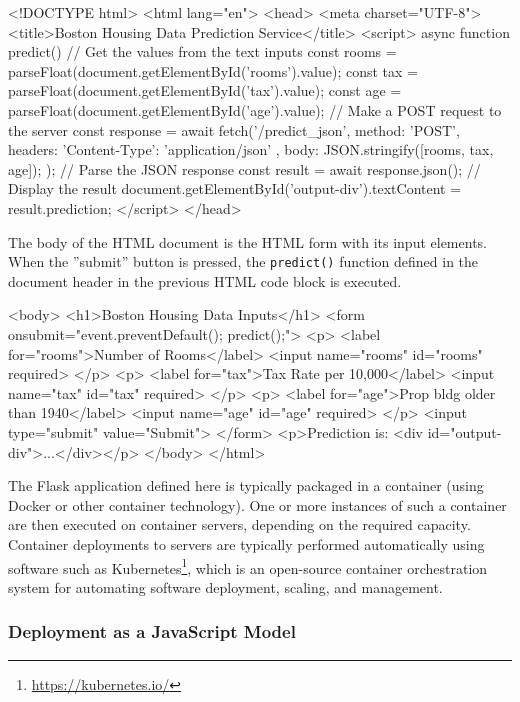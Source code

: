 \begin{withcode}
\begin{htmlcode}
<!DOCTYPE html>
<html lang="en">
 <head>
  <meta charset="UTF-8">
   <title>Boston Housing Data Prediction Service</title>
   <script>
    async function predict() {
     // Get the values from the text inputs
     const rooms = parseFloat(document.getElementById('rooms').value);
     const tax = parseFloat(document.getElementById('tax').value);
     const age = parseFloat(document.getElementById('age').value);
     // Make a POST request to the server
     const response = await fetch('/predict_json', {
       method: 'POST',
       headers: { 'Content-Type': 'application/json' },
       body: JSON.stringify([rooms, tax, age]);
     });
     // Parse the JSON response
     const result = await response.json();
     // Display the result
     document.getElementById('output-div').textContent
       = result.prediction;
   }
  </script>
 </head>
\end{htmlcode}

The body of the HTML document is the HTML form with its input elements. When the ''submit'' button is pressed, the \texttt{predict()} function defined in the document header in the previous HTML code block is executed. 

\begin{htmlcode}
 <body>
  <h1>Boston Housing Data Inputs</h1>
  <form onsubmit="event.preventDefault(); predict();">
   <p>
    <label for="rooms">Number of Rooms</label>
    <input name="rooms" id="rooms" required>
   </p>
   <p>
    <label for="tax">Tax Rate per 10,000</label>
    <input name="tax" id="tax" required>
   </p>
   <p>
    <label for="age">Prop bldg older than 1940</label>
    <input name="age" id="age" required>
   </p>
   <input type="submit" value="Submit">
  </form>
  <p>Prediction is: <div id="output-div">...</div></p>
 </body>
</html>
\end{htmlcode}

The Flask application defined here is typically packaged in a container (using Docker or other container technology). One or more instances of such a container are then executed on container servers, depending on the required capacity. Container deployments to servers are typically performed automatically using software such as Kubernetes\footnote{\url{https://kubernetes.io/}}, which is an open-source container orchestration system for automating software deployment, scaling, and management. 

\subsubsection*{Deployment as a JavaScript Model}


\end{withcode}
